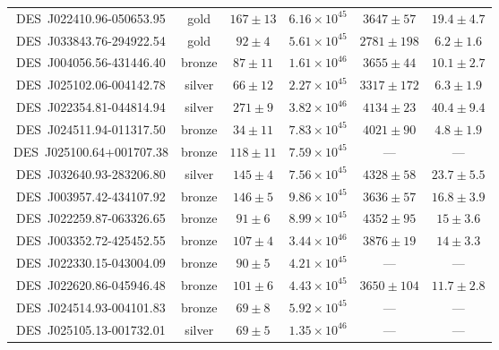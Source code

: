 \documentclass[11pt]{article}
\begin{document}
\begin{table}[htbp]
{\begin{tabular}{cccccc}
DES~J022410.96-050653.95 & gold & $167 \pm 13$ & $6.16 \times 10^{ 45}$ & $3647 \pm 57$ & $19.4 \pm 4.7$\\
DES~J033843.76-294922.54 & gold & $92 \pm 4$ & $5.61 \times 10^{ 45}$ & $2781 \pm 198$ & $6.2 \pm 1.6$\\
DES~J004056.56-431446.40 & bronze & $87 \pm 11$ & $1.61 \times 10^{ 46}$ & $3655 \pm 44$ & $10.1 \pm 2.7$\\
DES~J025102.06-004142.78 & silver & $66 \pm 12$ & $2.27 \times 10^{ 45}$ & $3317 \pm 172$ & $6.3 \pm 1.9$\\
DES~J022354.81-044814.94 & silver & $271 \pm 9$ & $3.82 \times 10^{ 46}$ & $4134 \pm 23$ & $40.4 \pm 9.4$\\
DES~J024511.94-011317.50 & bronze & $34 \pm 11$ & $7.83 \times 10^{ 45}$ & $4021 \pm 90$ & $4.8 \pm 1.9$\\
DES~J025100.64+001707.38 & bronze & $118 \pm 11$ & $7.59 \times 10^{ 45}$ & --- & ---\\
DES~J032640.93-283206.80 & silver & $145 \pm 4$ & $7.56 \times 10^{ 45}$ & $4328 \pm 58$ & $23.7 \pm 5.5$\\
DES~J003957.42-434107.92 & bronze & $146 \pm 5$ & $9.86 \times 10^{ 45}$ & $3636 \pm 57$ & $16.8 \pm 3.9$\\
DES~J022259.87-063326.65 & bronze & $91 \pm 6$ & $8.99 \times 10^{ 45}$ & $4352 \pm 95$ & $15 \pm 3.6$\\
DES~J003352.72-425452.55 & bronze & $107 \pm 4$ & $3.44 \times 10^{ 46}$ & $3876 \pm 19$ & $14 \pm 3.3$\\
DES~J022330.15-043004.09 & bronze & $90 \pm 5$ & $4.21 \times 10^{ 45}$ & --- & ---\\
DES~J022620.86-045946.48 & bronze & $101 \pm 6$ & $4.43 \times 10^{ 45}$ & $3650 \pm 104$ & $11.7 \pm 2.8$\\
DES~J024514.93-004101.83 & bronze & $69 \pm 8$ & $5.92 \times 10^{ 45}$ & --- & --- \\
DES~J025105.13-001732.01 & silver & $69 \pm 5$ & $1.35 \times 10^{ 46}$ & --- & --- \\
\hline
\end{tabular}
}
\end{table}
\end{document}
